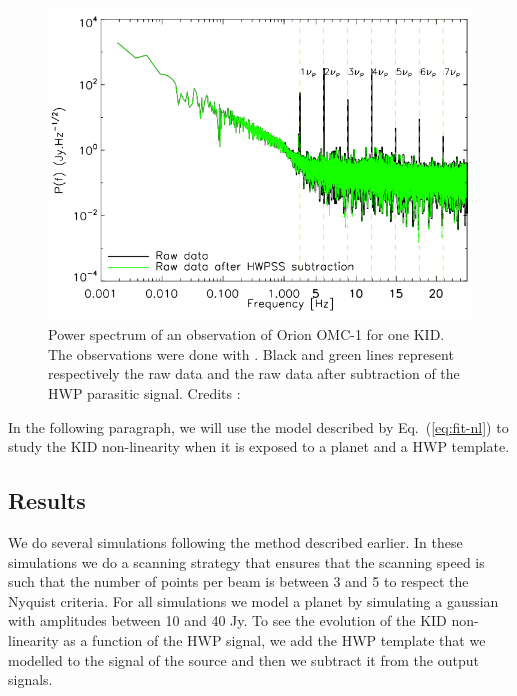 \begin{figure}[h]
\center
\includegraphics[clip, angle=0, width=\columnwidth]{Figures/hwp_power_spectrum.png}
\caption{Power spectrum of an observation of Orion OMC-1 for one KID. The observations were done with \nika . Black and green lines represent respectively the raw data and the raw data after subtraction of the HWP parasitic signal. Credits : \citet{2017A&A...599A..34R} }
\label{fig:hwp_power_spectrum}
\end{figure}

In the following paragraph, we will use the model described by Eq.~(\ref{eq:fit-nl}) to study the KID non-linearity when it is exposed to a planet and a HWP template.

\subsection{Results}

We do several simulations following the method described earlier. In these simulations we do a scanning strategy that ensures that the scanning speed is such that the number of points per beam is between 3 and 5 to respect the Nyquist criteria. For all simulations we model a planet by simulating a gaussian with amplitudes between 10 and 40 Jy. To see the evolution of the KID non-linearity as a function of the HWP signal, we add the HWP template that we modelled to the signal of the source and then we subtract it from the output signals.\\


